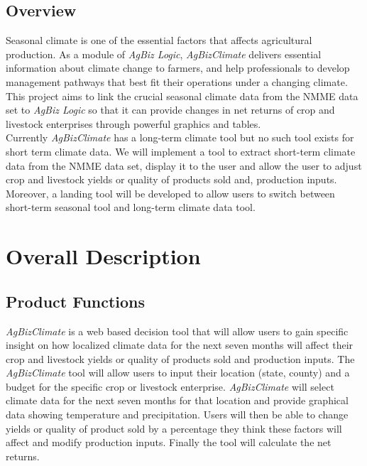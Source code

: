 \documentclass[onecolumn, draftclsnofoot,10pt, compsoc]{article}
\begin{document}
		\subsection{Overview}
			Seasonal climate is one of the essential factors that affects agricultural production. As a module of \textit{AgBiz Logic}, \textit{AgBizClimate} delivers essential information about climate change to farmers, and help professionals to develop management pathways that best fit their operations under a changing climate. This project aims to link the crucial seasonal climate data from the NMME data set to \textit{AgBiz Logic} so that it can provide changes in net returns of crop and livestock enterprises through powerful graphics and tables. \\
			Currently \textit{AgBizClimate} has a long-term climate tool but no such tool exists for short term climate data. We will implement a tool to extract short-term climate data from the NMME data set, display it to the user and allow the user to adjust crop and livestock yields or quality of products sold and, production inputs. Moreover, a landing tool will be developed to allow users to switch between short-term seasonal tool and long-term climate data tool.\\
\section{Overall Description}
	\subsection {Product Functions}
				\textit{AgBizClimate} is a web based decision tool that will allow users to gain specific insight on how localized climate data for the next seven months will affect their crop and livestock yields or quality of products sold and production inputs. The \textit{AgBizClimate} tool will allow users to input their location (state, county) and a budget for the specific crop or livestock enterprise. \textit{AgBizClimate} will select climate data for the next seven months for that location and provide graphical data showing temperature and precipitation. Users will then be able to change yields or quality of product sold by a percentage they think these factors will affect and modify production inputs. Finally the tool will calculate the net returns.\\
\end{document}
